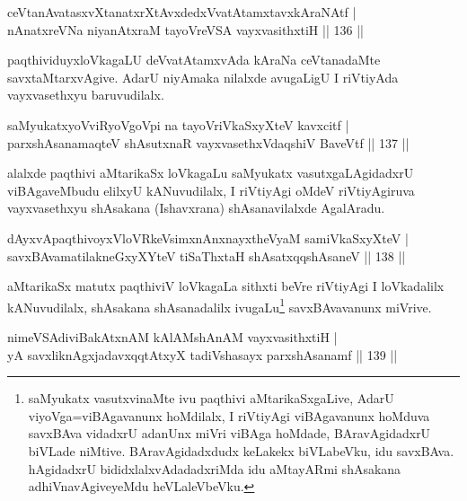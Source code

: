 \begin{shl}
ceVtanAvatasxvXtanatxrXtAvxdedxVvatAtamxtavxkAraNAtf |\\
nAnatxreVNa niyanAtxraM tayoVreVSA vayxvasithxtiH \hfill || 136 ||
\end{shl}

\begin{artha}
paqthividuyxloVkagaLU deVvatAtamxvAda kAraNa ceVtanadaMte savxtaMtarxvAgive. AdarU niyAmaka nilalxde avugaLigU I riVtiyAda vayxvasethxyu baruvudilalx.
\end{artha}

\begin{shl}
saMyukatxyoVviRyoVgoV\s pi na tayoVriVkaSxyXteV kavxcitf |\\
parxshAsanamaqteV shAsutxnaR vayxvasethxVdaqshiV BaveVtf \hfill || 137 ||
\end{shl}

\begin{artha}
alalxde paqthivi aMtarikaSx loVkagaLu saMyukatx vasutxgaLAgidadxrU viBAgaveMbudu elilxyU kANuvudilalx, I riVtiyAgi oMdeV riVtiyAgiruva vayxvasethxyu shAsakana (Ishavxrana) shAsanavilalxde AgalAradu.
\end{artha}

\begin{shl}
dAyxvApaqthivoyxVloVRkeV\s simxnAnxnayxtheVyaM samiVkaSxyXteV |\\
savxBAvamatilakneGxyXYteV tiSaThxtaH shAsatxqqshAsaneV \hfill || 138 ||
\end{shl}

\begin{artha}
aMtarikaSx matutx paqthiviV loVkagaLa sithxti beVre riVtiyAgi I loVkadalilx kANuvudilalx, shAsakana shAsanadalilx ivugaLu\footnote{saMyukatx vasutxvinaMte ivu paqthivi aMtarikaSxgaLive, AdarU viyoVga=viBAgavanunx hoMdilalx, I riVtiyAgi viBAgavanunx hoMduva savxBAva vidadxrU adanUnx miVri viBAga hoMdade, BAravAgidadxrU biVLade niMtive. BAravAgidadxdudx keLakekx biVLabeVku, idu savxBAva. hAgidadxrU bididxlalxvAdadadxriMda idu aMtayARmi shAsakana adhiVnavAgiveyeMdu heVLaleVbeVku.} savxBAvavanunx miVrive.
\end{artha}


\begin{shl}
nimeVSAdiviBakAtxnAM kAlAMshAnAM vayxvasithxtiH |\\
yA savxliknAgxjadavxqqtAtxyX tadiVshasayx parxshAsanamf \hfill || 139 ||
\end{shl}

